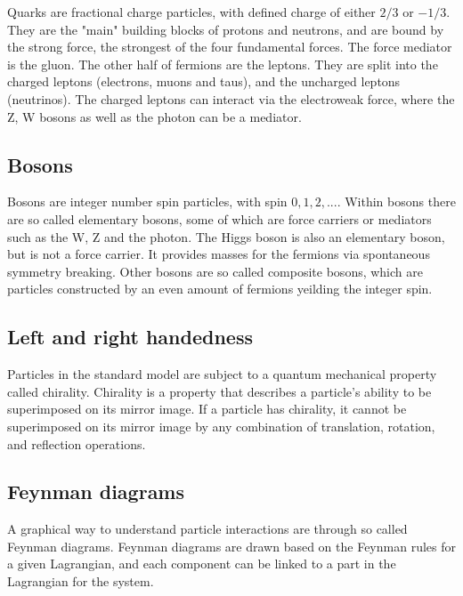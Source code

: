 Quarks are fractional charge particles, with defined charge of either $2/3$ or $-1/3$. They are the "main" building blocks of protons and neutrons, and are bound by the strong 
force, the strongest of the four fundamental forces. The force mediator is the gluon. The other half of fermions are the leptons. They are split into the charged 
leptons (electrons, muons and taus), and the uncharged leptons (neutrinos). The charged leptons can interact via the electroweak force, where the Z, W bosons 
as well as the photon can be a mediator.


\subsection*{Bosons}
Bosons are integer number spin particles, with spin $0, 1, 2, ...$. Within bosons there are so called elementary bosons, some of which are force carriers or mediators such as the W, Z and the photon.
The Higgs boson is also an elementary boson, but is not a force carrier. It provides masses for the fermions via spontaneous symmetry breaking\cite{Pich:819632}. Other 
bosons are so called composite bosons, which are particles constructed by an even amount of fermions yeilding the integer spin. 

\subsection*{Left and right handedness}
Particles in the standard model are subject to a quantum mechanical property called chirality. 
Chirality is a property that describes a particle's ability to be superimposed on its mirror image. 
If a particle has chirality, it cannot be superimposed on its mirror image by any combination of translation, 
rotation, and reflection operations. \cite{weinberg_1995}

\subsection*{Feynman diagrams}
A graphical way to understand particle interactions are through so called Feynman diagrams. Feynman diagrams are drawn based on the Feynman rules for a given Lagrangian\cite{Pich:819632}\cite{feynrules}, and each component 
can be linked to a part in the Lagrangian for the system. 

